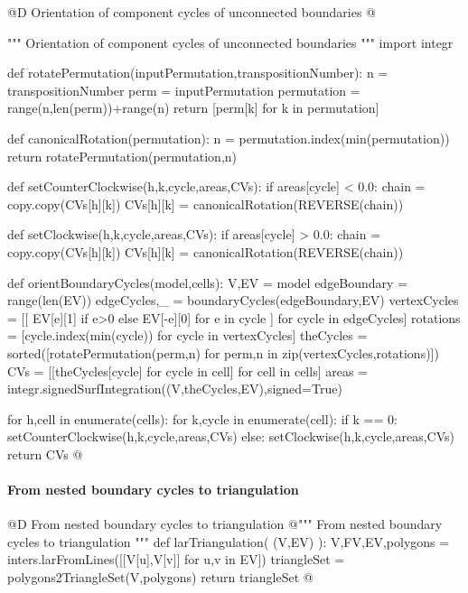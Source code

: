 \documentclass[11pt,oneside]{article}    %
\begin{document}
@D Orientation of component cycles of unconnected boundaries 
@{""" Orientation of component cycles of unconnected boundaries """
import integr

def rotatePermutation(inputPermutation,transpositionNumber):
    n = transpositionNumber
    perm = inputPermutation
    permutation = range(n,len(perm))+range(n) 
    return [perm[k] for k in permutation]

def canonicalRotation(permutation):
    n = permutation.index(min(permutation))
    return rotatePermutation(permutation,n)

def setCounterClockwise(h,k,cycle,areas,CVs):
    if areas[cycle] < 0.0: 
        chain = copy.copy(CVs[h][k])
        CVs[h][k] = canonicalRotation(REVERSE(chain))

def setClockwise(h,k,cycle,areas,CVs):
    if areas[cycle] > 0.0: 
        chain = copy.copy(CVs[h][k])
        CVs[h][k] = canonicalRotation(REVERSE(chain))

def orientBoundaryCycles(model,cells):
    V,EV = model
    edgeBoundary = range(len(EV))
    edgeCycles,_ = boundaryCycles(edgeBoundary,EV)
    vertexCycles = [[ EV[e][1] if e>0 else EV[-e][0] for e in cycle ] for cycle in edgeCycles]
    rotations = [cycle.index(min(cycle)) for cycle in vertexCycles]
    theCycles = sorted([rotatePermutation(perm,n) for perm,n in zip(vertexCycles,rotations)])
    CVs = [[theCycles[cycle] for cycle in cell] for cell in cells]
    areas = integr.signedSurfIntegration((V,theCycles,EV),signed=True)
    
    for h,cell in enumerate(cells):
        for k,cycle in enumerate(cell):
            if k == 0: setCounterClockwise(h,k,cycle,areas,CVs)
            else: setClockwise(h,k,cycle,areas,CVs)
    return CVs
@}

\paragraph{From nested boundary cycles to triangulation}
@D From nested boundary cycles to triangulation 
@{""" From nested boundary cycles to triangulation """    
def larTriangulation( (V,EV) ):
    V,FV,EV,polygons = inters.larFromLines([[V[u],V[v]] for u,v in EV])
    triangleSet = polygons2TriangleSet(V,polygons)
    return triangleSet
@}
\end{document}
